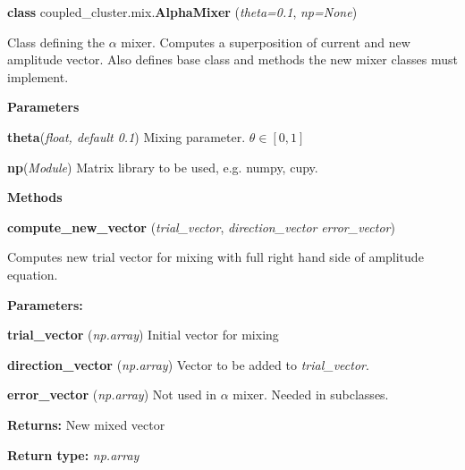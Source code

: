 \begin{tcolorbox}
    {\selectfont
    \textbf{class} coupled\_cluster.mix.\textbf{AlphaMixer}
    (\emph{theta=0.1}, \emph{np=None})

    \vspace{1em}
    Class defining the $\alpha$ mixer. Computes a superposition of current and new 
    amplitude vector. Also defines base class and methods the new mixer classes must
    implement.
        
    \vspace{1em}
    \textbf{Parameters}

    \hspace{2em}\textbf{theta}(\emph{float, default 0.1}) 
        Mixing parameter. $\theta \in [0, 1]$

    \hspace{2em}\textbf{np}(\emph{Module})
        Matrix library to be used, e.g. numpy, cupy.

    \vspace{1em} 
    \textbf{Methods}

    \hspace{2em} \textbf{compute\_new\_vector}
        (\emph{trial\_vector}, \emph{direction\_vector} \emph{error\_vector})

        \begin{adjustwidth}{4em}{}
        Computes new trial vector for mixing with full right hand side of amplitude 
        equation.

        \textbf{Parameters:} 

            \hspace{1.5em}\textbf{trial\_vector} (\emph{np.array}) 
            Initial vector for mixing

            \hspace{1.5em}\textbf{direction\_vector} (\emph{np.array})
            Vector to be added to \emph{trial\_vector}.

            \hspace{1.5em}\textbf{error\_vector} (\emph{np.array})
            Not used in $\alpha$ mixer. Needed in subclasses.

        \textbf{Returns:} New mixed vector

        \textbf{Return type:} \emph{np.array}

        \end{adjustwidth}
    } 
\end{tcolorbox}